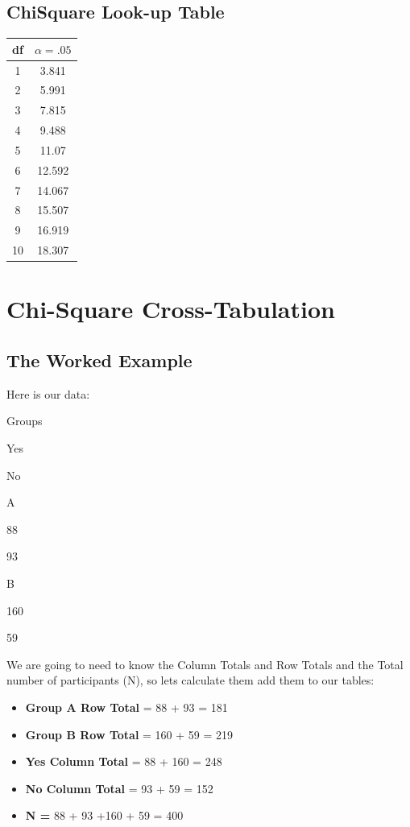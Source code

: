 \documentclass[
  oneside]{book}
\providecommand{\tightlist}{%
  \setlength{\itemsep}{0pt}\setlength{\parskip}{0pt}}
\begin{document}
\hypertarget{chisquare-look-up-table}{%
\section{ChiSquare Look-up Table}\label{chisquare-look-up-table}}

\begin{longtable}[]{@{}cc@{}}
\toprule
df & \(\alpha = .05\) \\
\midrule
\endhead
1 & 3.841 \\
2 & 5.991 \\
3 & 7.815 \\
4 & 9.488 \\
5 & 11.07 \\
6 & 12.592 \\
7 & 14.067 \\
8 & 15.507 \\
9 & 16.919 \\
10 & 18.307 \\
\bottomrule
\end{longtable}

\hypertarget{chi-square-cross-tabulation}{%
\chapter{Chi-Square Cross-Tabulation}\label{chi-square-cross-tabulation}}

\hypertarget{the-worked-example-1}{%
\section{The Worked Example}\label{the-worked-example-1}}

Here is our data:

Groups

Yes

No

A

88

93

B

160

59

We are going to need to know the Column Totals and Row Totals and the Total number of participants (N), so lets calculate them add them to our tables:

\begin{itemize}
\tightlist
\item
  \textbf{Group A Row Total} = 88 + 93 = 181
\item
  \textbf{Group B Row Total} = 160 + 59 = 219
\item
  \textbf{Yes Column Total} = 88 + 160 = 248
\item
  \textbf{No Column Total} = 93 + 59 = 152
\item
  \textbf{N =} 88 + 93 +160 + 59 = 400
\end{itemize}
\end{document}
